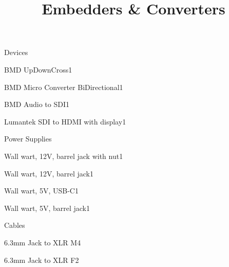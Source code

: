 \def\papersize{5}




\title{Embedders \& Converters}

\begin{checklist}{Devices}
  \item{BMD UpDownCross}{1}
  \item{BMD Micro Converter BiDirectional}{1}
  \item{BMD Audio to SDI}{1}
  \item{Lumantek SDI to HDMI with display}{1}
\end{checklist}

\begin{checklist}{Power Supplies}
  \item{Wall wart, 12V, barrel jack with nut}{1}
  \item{Wall wart, 12V, barrel jack}{1}
  \item{Wall wart, 5V, USB-C}{1}
  \item{Wall wart, 5V, barrel jack}{1}
\end{checklist}

\begin{checklist}{Cables}
  \item{6.3mm Jack to XLR M}{4}
  \item{6.3mm Jack to XLR F}{2}
\end{checklist}



